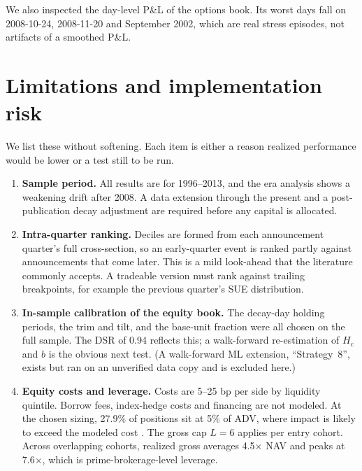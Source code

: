 \documentclass[11pt]{article}
\theoremstyle{definition}
\newcommand{\1}{\mathbf{1}}
\begin{document}
We also inspected the day-level P\&L of the options book. Its worst days fall on
2008-10-24, 2008-11-20 and September 2002, which are real stress episodes, not artifacts of
a smoothed P\&L.

\section{Limitations and implementation risk}\label{sec:limits}

We list these without softening. Each item is either a reason realized performance would be
lower or a test still to be run.

\begin{enumerate}
\item \textbf{Sample period.} All results are for 1996--2013, and the era analysis shows a
      weakening drift after 2008. A data extension through the present and a
      post-publication decay adjustment \citep{McLeanPontiff2016} are required before any
      capital is allocated.
\item \textbf{Intra-quarter ranking.} Deciles are formed from each announcement quarter's
      full cross-section, so an early-quarter event is ranked partly against announcements
      that come later. This is a mild look-ahead that the literature commonly accepts. A
      tradeable version must rank against trailing breakpoints, for example the previous
      quarter's SUE distribution.
\item \textbf{In-sample calibration of the equity book.} The decay-day holding periods, the
      trim and tilt, and the base-unit fraction were all chosen on the full sample. The DSR
      of 0.94 reflects this; a walk-forward re-estimation of $H_c$ and $b$ is the obvious
      next test. (A walk-forward ML extension, ``Strategy~8'', exists but ran on an
      unverified data copy and is excluded here.)
\item \textbf{Equity costs and leverage.} Costs are 5--25 bp per side by liquidity
      quintile. Borrow fees, index-hedge costs and financing are not modeled. At the chosen
      sizing, 27.9\% of positions sit at 5\% of ADV, where impact is likely to exceed the
      modeled cost \citep{FrazziniIsraelMoskowitz2018,NovyMarxVelikov2016}. The gross cap
      $L=6$ applies per entry cohort. Across overlapping cohorts, realized gross averages
      4.5$\times$ NAV and peaks at 7.6$\times$, which is prime-brokerage-level leverage.

\end{enumerate}
\end{document}
